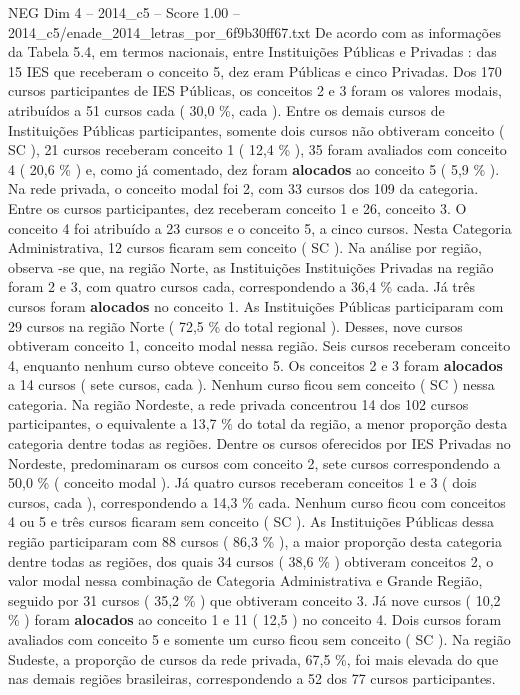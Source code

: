 \begin{textsample}{NEG Dim 4 – 2014\_c5 – Score 1.00 – 2014\_c5/enade\_2014\_letras\_por\_6f9b30ff67.txt}
De acordo com as informações da Tabela 5.4, em termos nacionais, entre Instituições Públicas e Privadas : das 15 IES que receberam o conceito 5, dez eram Públicas e cinco Privadas.
Dos 170 cursos participantes de IES Públicas, os conceitos 2 e 3 foram os valores modais, atribuídos a 51 cursos cada ( 30,0 \%, cada ).
Entre os demais cursos de Instituições Públicas participantes, somente dois cursos não obtiveram conceito ( SC ), 21 cursos receberam conceito 1 ( 12,4 \% ), 35 foram avaliados com conceito 4 ( 20,6 \% ) e, como já comentado, dez foram \textbf{alocados} ao conceito 5 ( 5,9 \% ).
Na rede privada, o conceito modal foi 2, com 33 cursos dos 109 da categoria.
Entre os cursos participantes, dez receberam conceito 1 e 26, conceito 3.
O conceito 4 foi atribuído a 23 cursos e o conceito 5, a cinco cursos.
Nesta Categoria Administrativa, 12 cursos ficaram sem conceito ( SC ).
Na análise por região, observa -se que, na região Norte, as Instituições Instituições Privadas na região foram 2 e 3, com quatro cursos cada, correspondendo a 36,4 \% cada.
Já três cursos foram \textbf{alocados} no conceito 1.
As Instituições Públicas participaram com 29 cursos na região Norte ( 72,5 \% do total regional ).
Desses, nove cursos obtiveram conceito 1, conceito modal nessa região.
Seis cursos receberam conceito 4, enquanto nenhum curso obteve conceito 5.
Os conceitos 2 e 3 foram \textbf{alocados} a 14 cursos ( sete cursos, cada ).
Nenhum curso ficou sem conceito ( SC ) nessa categoria.
Na região Nordeste, a rede privada concentrou 14 dos 102 cursos participantes, o equivalente a 13,7 \% do total da região, a menor proporção desta categoria dentre todas as regiões.
Dentre os cursos oferecidos por IES Privadas no Nordeste, predominaram os cursos com conceito 2, sete cursos correspondendo a 50,0 \% ( conceito modal ).
Já quatro cursos receberam conceitos 1 e 3 ( dois cursos, cada ), correspondendo a 14,3 \% cada.
Nenhum curso ficou com conceitos 4 ou 5 e três cursos ficaram sem conceito ( SC ).
As Instituições Públicas dessa região participaram com 88 cursos ( 86,3 \% ), a maior proporção desta categoria dentre todas as regiões, dos quais 34 cursos ( 38,6 \% ) obtiveram conceitos 2, o valor modal nessa combinação de Categoria Administrativa e Grande Região, seguido por 31 cursos ( 35,2 \% ) que obtiveram conceito 3.
Já nove cursos ( 10,2 \% ) foram \textbf{alocados} ao conceito 1 e 11 ( 12,5 ) no conceito 4.
Dois cursos foram avaliados com conceito 5 e somente um curso ficou sem conceito ( SC ).
Na região Sudeste, a proporção de cursos da rede privada, 67,5 \%, foi mais elevada do que nas demais regiões brasileiras, correspondendo a 52 dos 77 cursos participantes.

\end{textsample}
